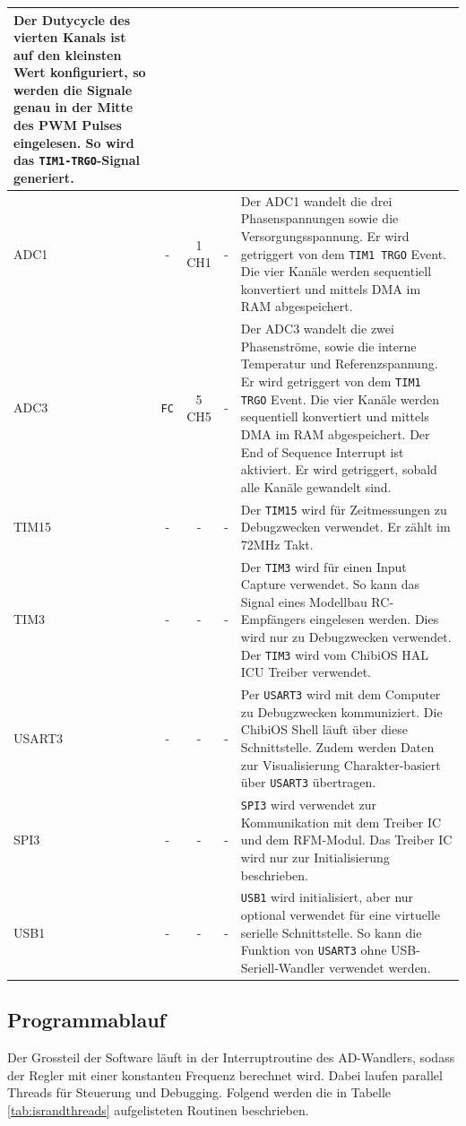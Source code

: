\begin{tabularx}{\textwidth}{l|c|c|c|X}
	Der Dutycycle des vierten Kanals ist auf den kleinsten Wert konfiguriert, so werden die Signale genau in der Mitte des PWM Pulses eingelesen. So wird das \texttt{TIM1-TRGO}-Signal generiert.
	\\ \hline
	ADC1 &
	- &
	1 CH1 &
	- &
	Der ADC1 wandelt die drei Phasenspannungen sowie die Versorgungsspannung. Er wird getriggert von dem \texttt{TIM1 TRGO} Event. Die vier Kanäle werden sequentiell konvertiert und mittels DMA im RAM abgespeichert.
	\\ \hline
	ADC3 &
	\texttt{FC} &
	5 CH5 &
	- &
	Der ADC3 wandelt die zwei Phasenströme, sowie die interne Temperatur und Referenzspannung. Er wird getriggert von dem \texttt{TIM1 TRGO} Event. Die vier Kanäle werden sequentiell konvertiert und mittels DMA im RAM abgespeichert. Der End of Sequence Interrupt ist aktiviert. Er wird getriggert, sobald alle Kanäle gewandelt sind.
	\\ \hline
	TIM15 &
	- &
	- &
	- &
	Der \texttt{TIM15} wird für Zeitmessungen zu Debugzwecken verwendet. Er zählt im 72MHz Takt.
	\\ \hline
	TIM3 &
	- &
	- &
	- &
	Der \texttt{TIM3} wird für einen Input Capture verwendet. So kann das Signal eines Modellbau RC-Empfängers eingelesen werden. Dies wird nur zu Debugzwecken verwendet. Der \texttt{TIM3} wird vom ChibiOS HAL ICU Treiber verwendet.
	\\ \hline
	USART3 &
	- &
	- &
	- &
	Per \texttt{USART3} wird mit dem Computer zu Debugzwecken kommuniziert. Die ChibiOS Shell läuft über diese Schnittstelle. Zudem werden Daten zur Visualisierung Charakter-basiert über \texttt{USART3} übertragen.
	\\ \hline
	SPI3 &
	- &
	- &
	- &
	\texttt{SPI3} wird verwendet zur Kommunikation mit dem Treiber IC und dem RFM-Modul. Das Treiber IC wird nur zur Initialisierung beschrieben.
	\\ \hline
	USB1 &
	- &
	- &
	- &
	\texttt{USB1} wird initialisiert, aber nur optional verwendet für eine virtuelle serielle Schnittstelle. So kann die Funktion von \texttt{USART3} ohne USB-Seriell-Wandler verwendet werden. \\
	\hline
\end{tabularx}
\label{tab:periph}


\subsection*{Programmablauf}
Der Grossteil der Software läuft in der Interruptroutine des AD-Wandlers, sodass der Regler mit einer konstanten Frequenz berechnet wird. Dabei laufen parallel Threads für Steuerung und Debugging. Folgend werden die in Tabelle \ref{tab:israndthreads} aufgelisteten Routinen beschrieben.\\

